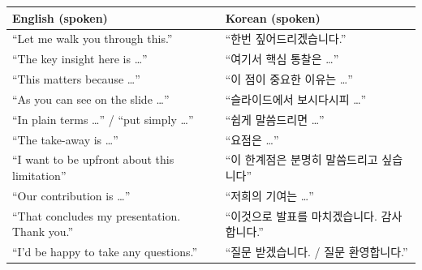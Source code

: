 \documentclass[10pt,a4paper]{article}
\begin{document}
\vspace{4pt}

\footnotesize

\begin{longtable}{@{}p{6.5cm} p{9cm}@{}}
\toprule
\textbf{English (spoken)} & \textbf{Korean (spoken)} \\
\midrule
``Let me walk you through this.''              & ``한번 짚어드리겠습니다.'' \\
``The key insight here is \ldots''              & ``여기서 핵심 통찰은 \ldots'' \\
``This matters because \ldots''                 & ``이 점이 중요한 이유는 \ldots'' \\
``As you can see on the slide \ldots''          & ``슬라이드에서 보시다시피 \ldots'' \\
``In plain terms \ldots'' / ``put simply \ldots'' & ``쉽게 말씀드리면 \ldots'' \\
``The take-away is \ldots''                     & ``요점은 \ldots'' \\
``I want to be upfront about this limitation''  & ``이 한계점은 분명히 말씀드리고 싶습니다'' \\
``Our contribution is \ldots''                   & ``저희의 기여는 \ldots'' \\
``That concludes my presentation. Thank you.''  & ``이것으로 발표를 마치겠습니다. 감사합니다.'' \\
``I'd be happy to take any questions.''         & ``질문 받겠습니다. / 질문 환영합니다.'' \\
\bottomrule
\end{longtable}
\end{document}
